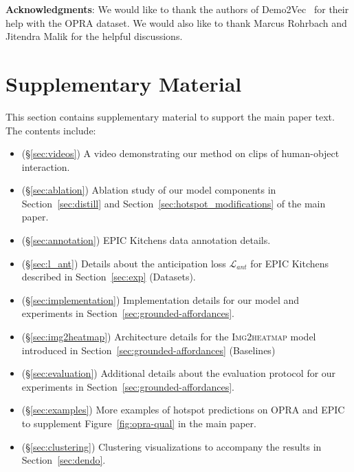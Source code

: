 \documentclass[10pt,twocolumn,letterpaper]{article}
\newcommand{\SC}[1]{{\textsc{#1}}}
\newcommand{\reffig}[1]{Figure~\ref{#1}}
\newcommand{\refsec}[1]{Section~\ref{#1}}
\begin{document}
\vspace{0.1in}
{\noindent\textbf{Acknowledgments}: We would like to thank the authors of Demo2Vec~\cite{fang2018demo2vec} for their help with the OPRA dataset. We would also like to thank Marcus Rohrbach and Jitendra Malik for the helpful discussions.}
 
{\small


}

\newpage

\setcounter{section}{0}
\setcounter{figure}{0}
\setcounter{table}{0}
\renewcommand{\thesection}{S\arabic{section}}
\renewcommand{\thetable}{S\arabic{table}}
\renewcommand{\thefigure}{S\arabic{figure}}

\section*{Supplementary Material}

This section contains supplementary material to support the main paper text. The contents include:
\begin{itemize}[leftmargin=*]
\itemsep0em 
    \item (\S\ref{sec:videos}) A video demonstrating our method on clips of human-object interaction.
    \item (\S\ref{sec:ablation}) Ablation study of our model components in \refsec{sec:distill} and \refsec{sec:hotspot_modifications} of the main paper.
    \item (\S\ref{sec:annotation}) EPIC Kitchens data annotation details. 
    \item (\S\ref{sec:l_ant}) Details about the anticipation loss $\mathcal{L}_{ant}$ for EPIC Kitchens described in \refsec{sec:exp} (Datasets).      
    \item (\S\ref{sec:implementation}) Implementation details for our model and experiments in \refsec{sec:grounded-affordances}.
    \item (\S\ref{sec:img2heatmap}) Architecture details for the \SC{Img2heatmap} model introduced in \refsec{sec:grounded-affordances} (Baselines)
    \item (\S\ref{sec:evaluation}) Additional details about the evaluation protocol for our experiments in \refsec{sec:grounded-affordances}.
    \item (\S\ref{sec:examples}) More examples of hotspot predictions on OPRA and EPIC to supplement \reffig{fig:opra-qual} in the main paper.
    \item (\S\ref{sec:clustering}) Clustering visualizations to accompany the results in \refsec{sec:dendo}.
\end{itemize}
\end{document}
